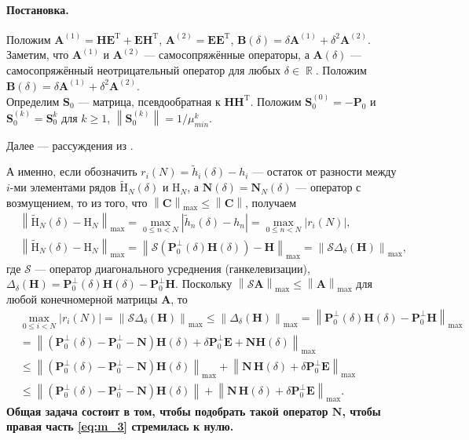\documentclass[specialist,
substylefile = spbu_report.rtx,
subf,href,colorlinks=true, 12pt]{disser}
\newcommand\norm[1]{\left\|#1\right\|}
\DeclareMathOperator\R{\mathbb{R}}
\newenvironment{statement}{\paragraph{Постановка.}}{\hfill}
\begin{document}
\begin{statement}
		Положим $\mathbf{A}^{(1)} = \mathbf{H}\mathbf{E}^\mathrm{T} + \mathbf{E}\mathbf{H}^\mathrm{T}$, $\mathbf{A}^{(2)} = \mathbf{E}\mathbf{E}^\mathrm{T}$, $\mathbf{B}(\delta) = \delta\mathbf{A}^{(1)} + \delta^2\mathbf{A}^{(2)}$. Заметим, что $\mathbf{A}^{(1)}$ и $\mathbf{A}^{(2)}$ --- самосопряжённые операторы, а $\mathbf{A}(\delta)$ --- самосопряжённый неотрицательный оператор для любых $\delta\in\R$. Положим $\mathbf{B}(\delta)=\delta\mathbf{A}^{(1)} + \delta^2\mathbf{A}^{(2)}$.\\
		Определим $\mathbf{S}_0$ --- матрица, псевдообратная к $\mathbf{HH}^\mathrm{T}$. Положим $\mathbf{S}_0^{(0)} = -\mathbf{P}_0$ и $\mathbf{S}_0^{(k)}=\mathbf{S}_0^k$ для $k\geqslant1$, $\norm{\mathbf{S}_0^{(k)}}=1/\mu_{min}^k$.
		
		Далее --- рассуждения из \cite[раздел 5.3]{Nekrutkin10}.
		
		А именно, если обозначить $r_i(N)=\widetilde{h}_i(\delta)-h_i$ --- остаток от разности между $i$-ми элементами рядов $\widetilde{\mathrm{H}}_N(\delta)\text{ и }\mathrm{H}_N$, а $\mathbf{N}(\delta) = \mathbf{N}_N(\delta)$ --- оператор с возмущением, то из того, что  $\norm{\mathbf{C}}_{\max}\leqslant \norm{\mathbf{C}}$, получаем
		\begin{align*}
			&\norm{\widetilde{\mathrm{H}}_{N}(\delta) - \mathrm{H}_N}_{\max} = \max_{0\leqslant n<N}|\widetilde{h}_n(\delta) - h_n| = \max_{0\leqslant n < N}|r_i(N)|,\\
			&\norm{\widetilde{\mathrm{H}}_{N}(\delta) - \mathrm{H}_N}_{\max} = \norm{\mathcal{S}(\mathbf{P}_0^{\bot}(\delta)\mathbf{H}(\delta)) - \mathbf{H}}_{\max} = \norm{\mathcal{S}\Delta_\delta(\mathbf{H})}_{\max},
		\end{align*}
		где $\mathcal{S}$ --- оператор диагонального усреднения (ганкелевизации), $\Delta_\delta(\mathbf{H}) = \mathbf{P}_0^\bot(\delta)\mathbf{H}(\delta) - \mathbf{P}_0^\bot\mathbf{H}$. Поскольку $\norm{\mathcal{S}\mathbf{A}}_{\max}\leqslant\norm{\mathbf{A}}_{\max}$ для любой конечномерной матрицы $\mathbf{A}$, то
		\begin{align}
			&\max_{0\leqslant i<N} |r_i(N)| = \norm{\mathcal{S}\Delta_\delta(\mathbf{H})}_{\max} \leqslant\norm{\Delta_\delta(\mathbf{H})}_{\max}=\norm{\mathbf{P}_0^\bot(\delta)\mathbf{H}(\delta) - \mathbf{P}_0^\bot\mathbf{H}}_{\max}\nonumber
			\\ 
			&=\norm{(\mathbf{P}_0^\bot(\delta) - \mathbf{P}_0^\bot-\mathbf{N})\mathbf{H}(\delta) + \delta\mathbf{P}_0^\bot\mathbf{E} + \mathbf{N}\mathbf{H}(\delta) }_{\max}\nonumber
			\\
			&\leqslant\norm{(\mathbf{P}_0^\bot(\delta)- \mathbf{P}_0^\bot-\mathbf{N})\mathbf{H}(\delta)}_{\max} + \norm{ \mathbf{N}\, \mathbf{H}(\delta) + \delta \mathbf{P}_0^\perp \mathbf{E}}_{\max}\nonumber
			\\
			&\leqslant\norm{(\mathbf{P}_0^\bot(\delta)- \mathbf{P}_0^\bot-\mathbf{N})\mathbf{H}(\delta)} + \norm{ \mathbf{N}\, \mathbf{H}(\delta) + \delta \mathbf{P}_0^\perp \mathbf{E}}_{\max}.\label{eq:m_3}
		\end{align}
		{\bf Общая задача состоит в том, чтобы подобрать такой оператор $\mathbf{N}$, чтобы правая часть \eqref{eq:m_3} стремилась к нулю.}
	\end{statement}\\
\end{document}
